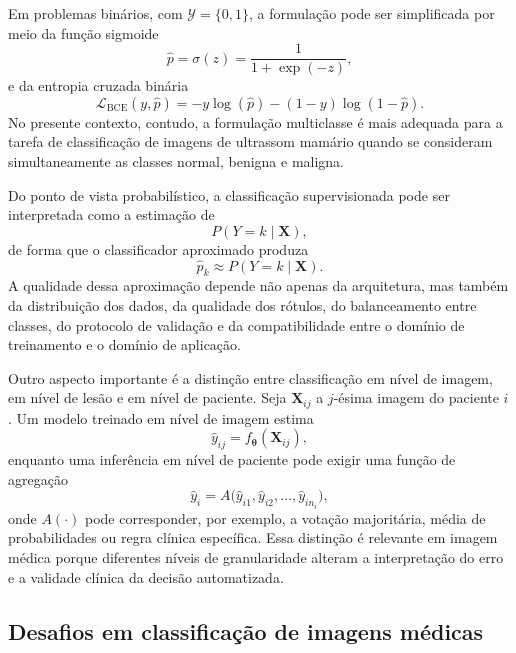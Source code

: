 \documentclass[tcc,capa]{texufpel}
\begin{document}
Em problemas binários, com $\mathcal{Y}=\{0,1\}$, a formulação pode ser simplificada por meio da função sigmoide
\begin{equation}
\hat{p}
=
\sigma(z)
=
\frac{1}{1+\exp(-z)},
\end{equation}
e da entropia cruzada binária
\begin{equation}
\mathcal{L}_{\text{BCE}}(y,\hat{p})
=
-y \log(\hat{p}) - (1-y)\log(1-\hat{p}).
\end{equation}
No presente contexto, contudo, a formulação multiclasse é mais adequada para a tarefa de classificação de imagens de ultrassom mamário quando se consideram simultaneamente as classes normal, benigna e maligna.

Do ponto de vista probabilístico, a classificação supervisionada pode ser interpretada como a estimação de
\begin{equation}
P(Y=k \mid \mathbf{X}),
\end{equation}
de forma que o classificador aproximado produza
\begin{equation}
\hat{p}_k \approx P(Y=k \mid \mathbf{X}).
\end{equation}
A qualidade dessa aproximação depende não apenas da arquitetura, mas também da distribuição dos dados, da qualidade dos rótulos, do balanceamento entre classes, do protocolo de validação e da compatibilidade entre o domínio de treinamento e o domínio de aplicação.

Outro aspecto importante é a distinção entre classificação em nível de imagem, em nível de lesão e em nível de paciente. Seja $\mathbf{X}_{ij}$ a $j$-ésima imagem do paciente $i$. Um modelo treinado em nível de imagem estima
\begin{equation}
\hat{y}_{ij} = f_{\boldsymbol{\theta}}(\mathbf{X}_{ij}),
\end{equation}
enquanto uma inferência em nível de paciente pode exigir uma função de agregação
\begin{equation}
\hat{y}_{i}
=
A\big(
\hat{y}_{i1},\hat{y}_{i2},\dots,\hat{y}_{in_i}
\big),
\end{equation}
onde $A(\cdot)$ pode corresponder, por exemplo, a votação majoritária, média de probabilidades ou regra clínica específica. Essa distinção é relevante em imagem médica porque diferentes níveis de granularidade alteram a interpretação do erro e a validade clínica da decisão automatizada.

\subsection{Desafios em classificação de imagens médicas}
\end{document}
